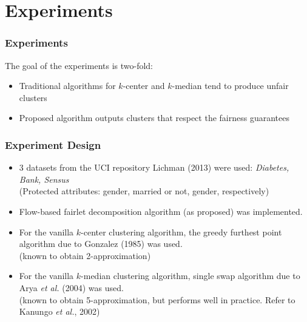 \documentclass{beamer}
\begin{document}

\section{Experiments}

\begin{frame}
\frametitle{Experiments}

The goal of the experiments is two-fold: \pause

\begin{itemize}
	\item Traditional algorithms for $k$-center and $k$-median tend to produce unfair clusters \pause

	\item Proposed algorithm outputs clusters that respect the fairness guarantees
\end{itemize}

\end{frame}



\begin{frame}
\frametitle{Experiment Design}

\begin{itemize}
	\item 3 datasets from the UCI repository Lichman (2013) were used: {\it Diabetes, Bank, Sensus}\\
	(Protected attributes: gender, married or not, gender, respectively) \pause
	
	\item Flow-based fairlet decomposition algorithm (as proposed) was implemented. \pause
	
	\item For the vanilla $k$-center clustering algorithm, the greedy furthest point algorithm due to Gonzalez (1985) was used.\\
	(known to obtain 2-approximation) \pause
	
	\item For the vanilla $k$-median clustering algorithm, single swap algorithm due to Arya {\it et al.} (2004) was used.\\
	(known to obtain 5-approximation, but performs well in practice. Refer to Kanungo {\it et al.}, 2002)

\end{itemize}

\end{frame}
\end{document}
